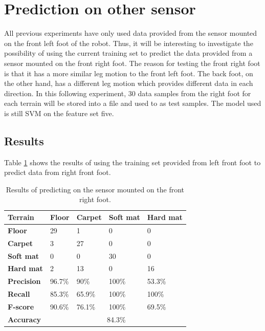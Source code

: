 \documentclass[USenglish]{ifimaster}  %
\begin{document}
\newpage
\section{Prediction on other sensor}
All previous experiments have only used data provided from the sensor mounted on the front left foot of the robot. Thus, it will be interesting to investigate the possibility of using the current training set to predict the data provided from a sensor mounted on the front right foot. The reason for testing the front right foot is that it has a more similar leg motion to the front left foot. The back foot, on the other hand, has a different leg motion which provides different data in each direction. In this following experiment, 30 data samples from the right foot for each terrain will be stored into a file and used to as test samples. The model used is still SVM on the feature set five.

	
\subsection{Results} 
Table \ref{tab:pred} shows the results of using the training set provided from left front foot to predict data from right front foot.
\begin{table}[h]
	\centering
	\begin{tabular}{lllll}
		\hline
		\textbf{Terrain} & \textbf{Floor} & \textbf{Carpet} & \textbf{Soft mat} & \textbf{Hard mat} \\ \hline
		\textbf{Floor} & \cellcolor[HTML]{FFFFC7}29 & 1 & 0 & 0 \\
		\textbf{Carpet} & 3 & \cellcolor[HTML]{FFFFC7}27 & 0 & 0 \\
		\textbf{Soft mat} & 0 & 0 & \cellcolor[HTML]{FFFFC7}30 & 0 \\
		\textbf{Hard mat} & 2 & 13 & 0 & \cellcolor[HTML]{FFFFC7}16 \\ \hline
		\textbf{Precision} & 96.7\% & 90\% & 100\% & 53.3\% \\
		\textbf{Recall} & 85.3\% & 65.9\% & 100\% & 100\% \\
		\textbf{F-score} & 90.6\% & 76.1\% & 100\% & 69.5\% \\ \hline
		\textbf{Accuracy} & \multicolumn{4}{c}{84.3\%} \\ \hline
	\end{tabular}
	\caption[Results of predicting sensor mounted on the front right foot]{Results of predicting on the sensor mounted on the front right foot.}
	\label{tab:pred}
\end{table}
	\FloatBarrier
	
\end{document}
